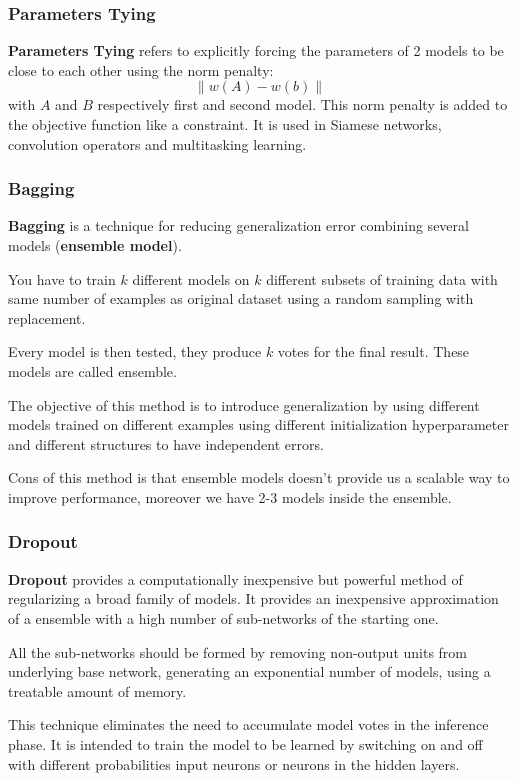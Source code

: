 \subsubsection{Parameters Tying}
\textbf{Parameters Tying} refers to explicitly forcing the parameters of 2 models
to be close to each other using the norm penalty:
\begin{equation}
    \|w(A)- w(b)\|
\end{equation}
with $A$ and $B$ respectively first and second model. This norm penalty is added
to the objective function like a constraint. It is used in Siamese networks,
convolution operators and multitasking learning.
\subsubsection{Bagging}
\textbf{Bagging} is a technique for reducing generalization error combining
several models (\textbf{ensemble model}).

You have to train $k$ different models on $k$ different subsets of training data
with same number of examples as original dataset using a random sampling with
replacement.

Every model is then tested, they produce $k$ votes for the final result. These
models are called ensemble.

The objective of this method is to introduce generalization by using different
models trained on different examples using different initialization hyperparameter
and different structures to have independent errors.

Cons of this method is that ensemble models doesn't provide us a scalable way to
improve performance, moreover we have 2-3 models inside the ensemble.
\subsubsection{Dropout}
\textbf{Dropout} provides a computationally inexpensive but powerful method of
regularizing a broad family of models. It provides an inexpensive approximation
of a ensemble with a high number of sub-networks of the starting one.

All the sub-networks should be formed by removing non-output units from underlying
base network, generating an exponential number of models, using a treatable
amount of memory.

This technique eliminates the need to accumulate model votes in the inference
phase. It is intended to train the model to be learned by switching on and off
with different probabilities input neurons or neurons in the hidden layers.

